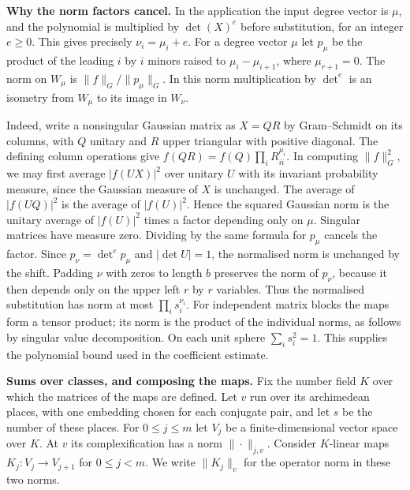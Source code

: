 \documentclass[11pt,letterpaper]{article}
\begin{document}
\textbf{Why the norm factors cancel.}
In the application the input degree vector is $\mu$, and the polynomial
is multiplied by $\det(X)^e$ before substitution, for an integer $e\ge0$.
This gives precisely $\nu_i=\mu_i+e$. For a degree vector $\mu$ let
$p_\mu$ be the product of the leading $i$ by $i$ minors raised to
$\mu_i-\mu_{i+1}$, where $\mu_{r+1}=0$. The norm on $W_\mu$ is
$\|f\|_G/\|p_\mu\|_G$. In this norm multiplication by $\det^e$ is
an isometry from $W_\mu$ to its image in $W_\nu$.

Indeed, write a nonsingular Gaussian matrix as $X=QR$ by
Gram--Schmidt on its columns, with $Q$ unitary and $R$ upper triangular
with positive diagonal. The defining column operations give
$f(QR)=f(Q)\prod_i R_{ii}^{\mu_i}$. In computing $\|f\|_G^2$, we may
first average $|f(UX)|^2$ over unitary $U$ with its invariant probability
measure, since the Gaussian measure of $X$ is unchanged. The average
of $|f(UQ)|^2$ is the average of $|f(U)|^2$. Hence the squared Gaussian
norm is the unitary average of $|f(U)|^2$ times a factor depending only
on $\mu$. Singular matrices have measure zero. Dividing by the same
formula for $p_\mu$ cancels the factor. Since $p_\nu=\det^e p_\mu$
and $|\det U|=1$, the normalised norm is unchanged by the shift.
Padding $\nu$ with zeros to length $b$ preserves the norm of $p_\nu$,
because it then depends only on the upper left $r$ by $r$ variables.
Thus the normalised substitution has norm at most $\prod_i s_i^{\nu_i}$.
For independent matrix blocks the maps form a tensor product; its norm
is the product of the individual norms, as follows by singular value
decomposition. On each unit sphere $\sum_i s_i^2=1$. This supplies the
polynomial bound used in the coefficient estimate.

\textbf{Sums over classes, and composing the maps.}
Fix the number field $K$ over which the matrices of the maps are defined.
Let $v$ run over its archimedean places, with one embedding chosen for
each conjugate pair, and let $s$ be the number of these places.
For $0\le j\le m$ let $V_j$ be a finite-dimensional vector space over $K$.
At $v$ its complexification has a norm $\|\cdot\|_{j,v}$.
Consider $K$-linear maps $K_j:V_j\to V_{j+1}$ for $0\le j<m$.
We write $\|K_j\|_v$ for the operator norm in these two norms.
\end{document}
